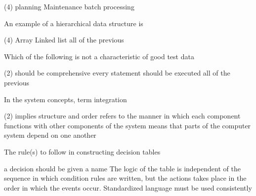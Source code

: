 \documentclass{article}
\begin{document}
\begin{questions}
\begin{exercise}
        \begin{choice}(4)
            \choice planning
            \choice {}
            \choice Maintenance
            \choice batch processing
        \end{choice}
    \end{exercise}
    \begin{exercise}
        An example of a hierarchical data structure is
        \begin{choice}(4)
            \choice Array
            \choice Linked list
            \choice {}
            \choice all of the previous
        \end{choice}
    \end{exercise}
    \begin{exercise}
        Which of the following is not a characteristic of good test data
        \begin{choice}(2)
            \choice {}
            \choice should be comprehensive
            \choice every statement should be executed
            \choice all of the previous
        \end{choice}
    \end{exercise}
    \begin{exercise}
        In the system concepts, term integration
        \begin{choice}(2)
            \choice implies structure and order
            \choice refers to the manner in which each component functions with other components of the system
            \choice means that parts of the computer system depend on one another
            \choice {}
        \end{choice}
    \end{exercise}
    \begin{exercise}
        The rule(s) to follow in constructing decision tables
        \begin{choice}
            \choice a decision should be given a name
            \choice The logic of the table is independent of the sequence in which condition rules are written, but the actions takes place in the order in which the events occur.
            \choice Standardized language must be used consistently
            \choice {}
        \end{choice}
    \end{exercise}
    \begin{exercise}

\end{exercise}
\end{questions}
\end{document}

